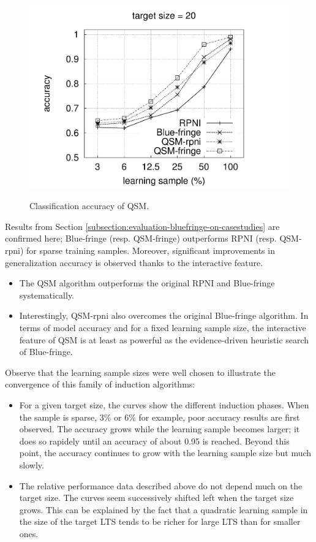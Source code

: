 \begin{figure}[t]
{  \includegraphics[trim=30mm 0mm 35mm 0mm, clip, page=4]{src/5-evaluation/images/accuracy}
}
\caption{Classification accuracy of QSM\label{image:evaluation-qsm-accuracy}.}
\end{figure}

Results from Section \ref{subsection:evaluation-bluefringe-on-casestudies} are confirmed here; Blue-fringe (resp. QSM-fringe) outperforms RPNI (resp. QSM-rpni) for sparse training samples. Moreover, significant improvements in generalization accuracy is observed thanks to the interactive feature.
\begin{itemize}
\item The QSM algorithm outperforms the original RPNI and Blue-fringe systematically.
\item Interestingly, QSM-rpni also overcomes the original Blue-fringe algorithm. In terms of model accuracy and for a fixed learning sample size, the interactive feature of QSM is at least as powerful as the evidence-driven heuristic search of Blue-fringe.
\end{itemize}

Observe that the learning sample sizes were well chosen to illustrate the convergence of this family of induction algorithms:
\begin{itemize}
\item For a given target size, the curves show the different induction phases. When the sample is sparse, 3\% or 6\% for example, poor accuracy results are first observed. The accuracy grows while the learning sample becomes larger; it does so rapidely until an accuracy of about 0.95 is reached. Beyond this point, the accuracy continues to grow with the learning sample size but much slowly. 
\item The relative performance data described above do not depend much on the target size. The curves seem successively shifted left when the target size grows. This can be explained by the fact that a quadratic learning sample in the size of the target LTS tends to be richer for large LTS than for smaller ones. 
\end{itemize}

